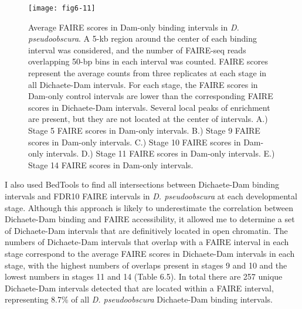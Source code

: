 \begin{figure}
\centering
\texttt{[image: fig6-11]}
\caption{Average FAIRE scores in Dam-only binding intervals in \emph{D. pseudoobscura}. A 5-kb region around the center of each binding interval was considered, and the number of FAIRE-seq reads overlapping 50-bp bins in each interval was counted. FAIRE scores represent the average counts from three replicates at each stage in all Dichaete-Dam intervals. For each stage, the FAIRE scores in Dam-only control intervals are lower than the corresponding FAIRE scores in Dichaete-Dam intervals. Several local peaks of enrichment are present, but they are not located at the center of intervals. A.) Stage 5 FAIRE scores in Dam-only intervals. B.) Stage 9 FAIRE scores in Dam-only intervals. C.) Stage 10 FAIRE scores in Dam-only intervals. D.) Stage 11 FAIRE scores in Dam-only intervals. E.) Stage 14 FAIRE scores in Dam-only intervals.}
\label{Figure 6.11}
\end{figure}

I also used BedTools to find all intersections between Dichaete-Dam binding intervals and FDR10 FAIRE intervals in \emph{D. pseudoobscura} at each developmental stage. Although this approach is likely to underestimate the correlation between Dichaete-Dam binding and FAIRE accessibility, it allowed me to determine a set of Dichaete-Dam intervals that are definitively located in open chromatin. The numbers of Dichaete-Dam intervals that overlap with a FAIRE interval in each stage correspond to the average FAIRE scores in Dichaete-Dam intervals in each stage, with the highest numbers of overlaps present in stages 9 and 10 and the lowest numbers in stages 11 and 14 (Table 6.5). In total there are 257 unique Dichaete-Dam intervals detected that are located within a FAIRE interval, representing 8.7\% of all \emph{D. pseudoobscura} Dichaete-Dam binding intervals.\\ 

